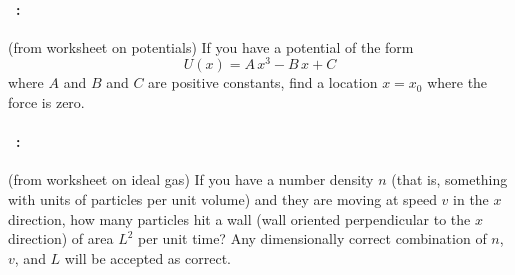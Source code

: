 \documentclass[12pt]{article} 
\begin{document}
\vfill

\paragraph{\problemname~\theproblem:}%
(from worksheet on potentials)
If you have a potential of the form
$$
U(x) = A\,x^3 - B\,x + C
$$ where $A$ and $B$ and $C$ are positive constants, find a location $x=x_0$ where
the force is zero.

\vfill

\paragraph{\problemname~\theproblem:}%
(from worksheet on ideal gas)
If you have a number density $n$ (that is, something with units of particles per unit volume)
and they are moving at speed $v$ in the $x$ direction, how many particles hit a wall (wall
oriented perpendicular to the $x$ direction) of area
$L^2$ per unit time? Any dimensionally correct combination of $n$, $v$, and $L$ will be accepted
as correct.

\vfill
~
\end{document}
